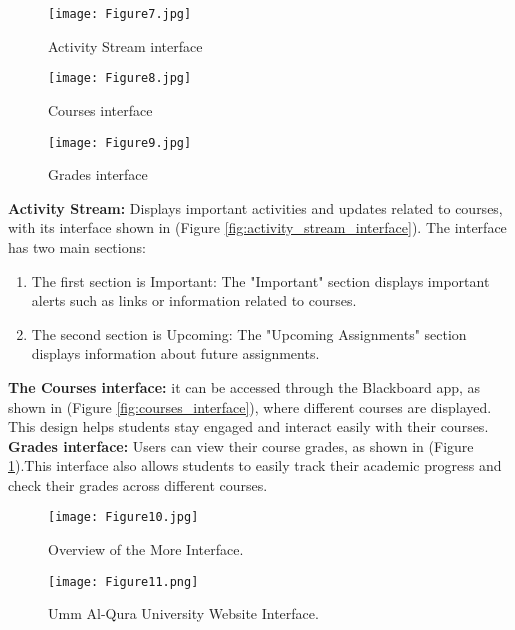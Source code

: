 \documentclass[a4paper,12pt]{article}
\begin{document}
\newpage
\begin{figure}[h]
    \centering
    \begin{minipage}{0.32\textwidth} 
        \centering
        \texttt{[image: Figure7.jpg]} 
        \caption{Activity Stream interface}
        \label{fig:activity_stream_interface}
    \end{minipage}\hfill
    \begin{minipage}{0.32\textwidth} 
        \centering
        \texttt{[image: Figure8.jpg]} 
        \caption{Courses interface}
        \label{fig:courses_interface}
    \end{minipage} \hfill 
    \begin{minipage}{0.32\textwidth} 
        \centering
        \texttt{[image: Figure9.jpg]} 
        \caption{Grades interface}
        \label{fig:grades_interface}
    \end{minipage}
\end{figure}

\noindent
\textbf{Activity Stream:} Displays important activities and updates related to courses, with
its interface shown in (Figure \ref{fig:activity_stream_interface}). The interface has two main sections:
\begin{enumerate}
    \item  The first section is Important: The "Important" section displays important alerts such as links or information related to courses.
    \item  The second section is Upcoming: The "Upcoming Assignments" section
displays information about future assignments.
\end{enumerate}
\noindent
\textbf{The Courses interface: }it can be accessed through the Blackboard app, as shown in (Figure \ref{fig:courses_interface}), where different courses are displayed. This design helps students stay engaged and interact easily with their courses.
\vspace{0.5cm}
\newline
\noindent
\textbf{Grades interface:} Users can view their course grades, as shown in (Figure \ref{fig:grades_interface}).This interface also allows students to easily track their academic progress and check their grades across different courses.

\newpage

\begin{figure}[h!]
    \centering
    \begin{minipage}[b]{0.30\textwidth}
        \texttt{[image: Figure10.jpg]}
        \caption{Overview of the More Interface.}
        \label{fig:more_interface}
    \end{minipage}
    \hfill
    \begin{minipage}[b]{0.65\textwidth}
        \texttt{[image: Figure11.png]}
        \caption{Umm Al-Qura University Website Interface.}
        \label{fig:uqu_website_interface}
    \end{minipage}
\end{figure}
\end{document}
